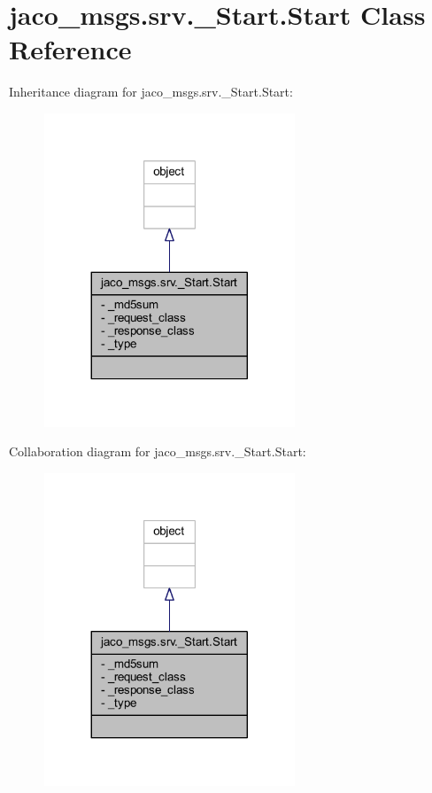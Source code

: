 \hypertarget{classjaco__msgs_1_1srv_1_1__Start_1_1Start}{}\section{jaco\+\_\+msgs.\+srv.\+\_\+\+Start.\+Start Class Reference}
\label{classjaco__msgs_1_1srv_1_1__Start_1_1Start}


Inheritance diagram for jaco\+\_\+msgs.\+srv.\+\_\+\+Start.\+Start\+:
\nopagebreak
\begin{figure}[H]
\begin{center}
\leavevmode
\includegraphics[width=212pt]{da/dc0/classjaco__msgs_1_1srv_1_1__Start_1_1Start__inherit__graph}
\end{center}
\end{figure}


Collaboration diagram for jaco\+\_\+msgs.\+srv.\+\_\+\+Start.\+Start\+:
\nopagebreak
\begin{figure}[H]
\begin{center}
\leavevmode
\includegraphics[width=212pt]{de/d2f/classjaco__msgs_1_1srv_1_1__Start_1_1Start__coll__graph}
\end{center}
\end{figure}
